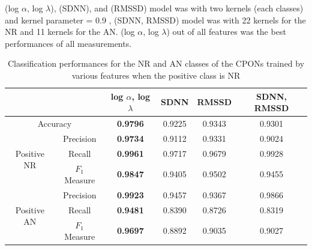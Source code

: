 \documentclass[times,twocolumn,final,authoryear]{elsarticle}
\begin{document}
 (log $\alpha$, log $\lambda$), (SDNN), and (RMSSD) model was with two kernels (each classes) and kernel  parameter = 0.9 ,  (SDNN, RMSSD) model was with 22 kernels for the NR and 11 kernels for the AN. (log $\alpha$, log $\lambda$) out of all features was the best performances of all measurements.
\begin{table}[!t]
\caption{Classification performances for the NR and AN classes of the CPONs trained by various features when the positive class is NR} \label{Table_sim1}
\begin{center}
\begin{tabular}{|c|c|c|c|c|c|}\hline\hline
\multicolumn{2}{|c|}{}& log $\alpha$, log $\lambda$     & SDNN   & RMSSD & SDNN, RMSSD \\ \hline\hline
\multicolumn{2}{|c|}{Accuracy}         
& {\bf 0.9796}  & 0.9225  & 0.9343 & 0.9301\\ \hline
\multirow{3}{*}{Positive NR} &  Precision 
& {\bf 0.9734}  & 0.9112  & 0.9331 &0.9024 \\ \cline{2-6}
& Recall   
& {\bf 0.9961}  & 0.9717 & 0.9679 &0.9928 \\ \cline{2-6}
& $F_1$ Measure 
& {\bf 0.9847}  & 0.9405 & 0.9502 & 0.9455\\ \hline
\multirow{3}{*}{Positive AN} &  Precision  
& {\bf 0.9923}  & 0.9457  & 0.9367 &0.9866\\ \cline{2-6}
& Recall   
& {\bf 0.9481}  & 0.8390 & 0.8726 &0.8319\\ \cline{2-6}
& $F_1$ Measure 
& {\bf 0.9697}  &  0.8892 & 0.9035 &0.9027\\ \hline
\end{tabular}
\end{center}
\end{table}
\end{document}
